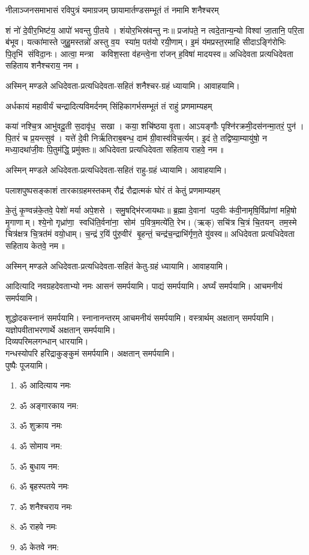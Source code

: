 \twolineshloka
{नीलाञ्जनसमाभासं रविपुत्रं यमाग्रजम्}
{छायामार्तण्डसम्भूतं तं नमामि शनैश्चरम्}

शं नो॑ दे॒वीर॒भिष्ट॑य॒ आपो॑ भवन्तु पी॒तये। शंयोर॒भिस्र॑वन्तु नः॥ प्रजा॑पते॒ न त्वदे॒तान्य॒न्यो
विश्वा॑ जा॒तानि॒ परि॒ता ब॑भूव। यत्का॑मास्ते जुहु॒मस्तन्नो॑ अस्तु व॒य स्या॑म॒ पत॑यो रयी॒णाम्। इ॒मं
य॑मप्रस्त॒रमाहि सीदाऽङ्गि॑रोभिः पि॒तृभि॑ संविदा॒नः। आत्वा॒ मन्त्रा कविश॒स्ता व॑हन्त्वे॒ना रा॑जन्
ह॒विषा॑ मादयस्व॥  अधिदेवता प्रत्यधिदेवता सहिताय शनैश्चराय॒ नम॥ 

अस्मिन् मण्डले अधिदेवता-प्रत्यधिदेवता-सहितं शनैश्चर-ग्रहं ध्यायामि। आवाहयामि।

\twolineshloka
{अर्धकायं महावीर्यं चन्द्रादित्यविमर्दनम्}
{सिंहिकागर्भसम्भूतं तं राहुं प्रणमाम्यहम्}

कया॑ नश्चि॒त्र आभु॑वदू॒ती स॒दावृ॑ध॒ सखा। कया॒ शचि॑ष्ठया वृ॒ता। आऽयङ्गौः
पृश्नि॑रक्रमी॒दस॑नन्मा॒तरं॒ पुन॑। पि॒तरं॑ च प्र॒यन्त्सुव॑। यत्ते॑ दे॒वी निर्ऋ॑तिराब॒बन्ध॒ दाम॑
ग्री॒वास्व॑विच॒र्त्यम्। इ॒दं  ते॒ तद्विष्या॒म्यायु॑षो॒ न मध्या॒दथा॑जी॒वः पि॒तुम॑द्धि॒ प्रमु॑क्तः॥ 
अधिदेवता प्रत्यधिदेवता सहिताय राहवे॒ नम॥ 

अस्मिन् मण्डले अधिदेवता-प्रत्यधिदेवता-सहितं राहु-ग्रहं ध्यायामि। आवाहयामि।

\twolineshloka
{पलाशपुष्पसङ्काशं तारकाग्रहमस्तकम्}
{रौद्रं रौद्रात्मकं घोरं तं केतुं प्रणमाम्यहम्}

के॒तुं कृ॒ण्वन्न॑के॒तवे॒ पेशो॑ मर्या अपे॒शसे। समु॒षद्भि॑रजायथाः॥ ब्र॒ह्मा दे॒वानां पद॒वीः
क॑वी॒नामृषि॒र्विप्रा॑णां महि॒षो मृ॒गाणाम्। श्ये॒नो गृध्रा॑णा॒ स्वधि॑ति॒र्वना॑ना॒ सोम॑
प॒वित्र॒मत्ये॑ति॒ रेभ\sn{}। (ऋक्) सचि॑त्र चि॒त्रं चि॒तयन् तम॒स्मे चित्र॑क्षत्र चि॒त्रत॑मं वयो॒धाम्।
च॒न्द्रं र॒यिं पु॑रु॒वीरं बृ॒हन्तं॒ चन्द्र॑च॒न्द्राभि॑र्गृण॒ते यु॑वस्व॥  अधिदेवता प्रत्यधिदेवता
सहिताय केतवे॒ नम॥ 

अस्मिन् मण्डले अधिदेवता-प्रत्यधिदेवता-सहितं केतु-ग्रहं ध्यायामि। आवाहयामि।

आदित्यादि नवग्रहदेवताभ्यो नमः आसनं समर्पयामि।
पाद्यं समर्पयामि। अर्घ्यं समर्पयामि। आचमनीयं समर्पयामि। 

शुद्धोदकस्नानं समर्पयामि। स्नानानन्तरम् आचमनीयं समर्पयामि।
वस्त्रार्थम् अक्षतान् समर्पयामि।\\
यज्ञोपवीताभरणार्थे अक्षतान् समर्पयामि।\\
दिव्यपरिमलगन्धान् धारयामि।\\
गन्धस्योपरि हरिद्राकुङ्कुमं समर्पयामि। अक्षतान् समर्पयामि। \\
पुष्पैः पूजयामि।

\begin{enumerate}%
\item ॐ आदित्याय नमः
\item ॐ अङ्गारकाय नम​:
\item ॐ शुक्राय नमः
\item ॐ सोमाय नम​:
\item ॐ बुधाय नम​:
\item ॐ बृहस्पतये नमः
\item ॐ शनैश्चराय नमः
\item ॐ राहवे नमः
\item ॐ केतवे नम​:
\end{enumerate}


